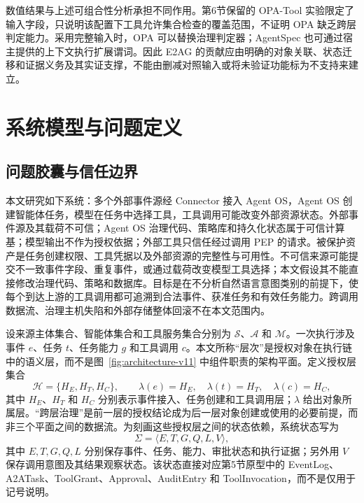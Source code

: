 数值结果与上述可组合性分析承担不同作用。第6节保留的 OPA-Tool 实验限定了输入字段，只说明该配置下工具允许集合检查的覆盖范围，不证明 OPA 缺乏跨层判定能力。采用完整输入时，OPA 可以替换治理判定器；AgentSpec 也可通过宿主提供的上下文执行扩展谓词。因此 E2AG 的贡献应由明确的对象关联、状态迁移和证据义务及其实证支撑，不能由删减对照输入或将未验证功能标为不支持来建立。

\section{系统模型与问题定义}\label{sec:problem-v11}

\subsection{问题胶囊与信任边界}

本文研究如下系统：多个外部事件源经 Connector 接入 Agent OS，Agent OS 创建智能体任务，模型在任务中选择工具，工具调用可能改变外部资源状态。外部事件源及其载荷不可信；Agent OS 治理代码、策略库和持久化状态属于可信计算基；模型输出不作为授权依据；外部工具只信任经过调用 PEP 的请求。被保护资产是任务创建权限、工具凭据以及外部资源的完整性与可用性。不可信来源可能提交不一致事件字段、重复事件，或通过载荷改变模型工具选择；本文假设其不能直接修改治理代码、策略和数据库。目标是在不分析自然语言意图类别的前提下，使每个到达上游的工具调用都可追溯到合法事件、获准任务和有效任务能力。跨调用数据流、治理主机失陷和外部存储整体回滚不在本文范围内。

设来源主体集合、智能体集合和工具服务集合分别为 $\mathcal{S}$、$\mathcal{A}$ 和 $\mathcal{M}$。一次执行涉及事件 $e$、任务 $t$、任务能力 $g$ 和工具调用 $c$。本文所称“层次”是授权对象在执行链中的语义层，而不是图~\ref{fig:architecture-v11} 中组件职责的架构平面。定义授权层集合
\begin{equation}
\mathcal{H}=\{H_E,H_T,H_C\},\qquad
\lambda(e)=H_E,\quad \lambda(t)=H_T,\quad \lambda(c)=H_C,
\label{eq:authorization-layers-v11}
\end{equation}
其中 $H_E$、$H_T$ 和 $H_C$ 分别表示事件接入、任务创建和工具调用层；$\lambda$ 给出对象所属层。“跨层治理”是前一层的授权结论成为后一层对象创建或使用的必要前提，而非三个平面之间的数据流。为刻画这些授权层之间的状态依赖，系统状态写为
\begin{equation}
\Sigma=\langle E,T,G,Q,L,V\rangle,
\label{eq:system-state-v11}
\end{equation}
其中 $E,T,G,Q,L$ 分别保存事件、任务、能力、审批状态和执行证据；另外用 $V$ 保存调用意图及其结果观察状态。该状态直接对应第5节原型中的 EventLog、A2ATask、ToolGrant、Approval、AuditEntry 和 ToolInvocation，而不是仅用于记号说明。

